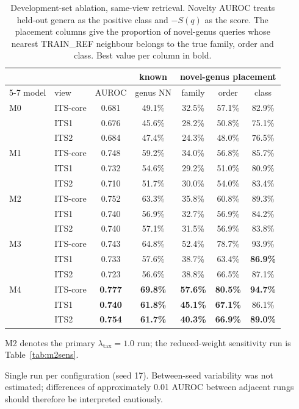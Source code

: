 \begin{table}[htbp]\centering
\begin{threeparttable}
\caption{Development-set ablation, same-view retrieval. Novelty AUROC treats held-out genera as the positive class and $-S(q)$ as the score. The placement columns give the proportion of novel-genus queries whose nearest TRAIN\_REF neighbour belongs to the true family, order and class. Best value per column in bold.}
\label{tab:ablation}
\small
\begin{tabular}{llccccc}
\toprule
 & & & known & \multicolumn{3}{c}{novel-genus placement} \\
\cmidrule(l){5-7}
model & view & AUROC & genus NN & family & order & class \\
\midrule
M0 & ITS-core & 0.681 & 49.1\% & 32.5\% & 57.1\% & 82.9\% \\
 & ITS1 & 0.676 & 45.6\% & 28.2\% & 50.8\% & 75.1\% \\
 & ITS2 & 0.684 & 47.4\% & 24.3\% & 48.0\% & 76.5\% \\
\addlinespace
M1 & ITS-core & 0.748 & 59.2\% & 34.0\% & 56.8\% & 85.7\% \\
 & ITS1 & 0.732 & 54.6\% & 29.2\% & 51.0\% & 80.9\% \\
 & ITS2 & 0.710 & 51.7\% & 30.0\% & 54.0\% & 83.4\% \\
\addlinespace
M2 & ITS-core & 0.752 & 63.3\% & 35.8\% & 60.8\% & 89.3\% \\
 & ITS1 & 0.740 & 56.9\% & 32.7\% & 56.9\% & 84.2\% \\
 & ITS2 & 0.740 & 57.1\% & 31.5\% & 56.9\% & 83.8\% \\
\addlinespace
M3 & ITS-core & 0.743 & 64.8\% & 52.4\% & 78.7\% & 93.9\% \\
 & ITS1 & 0.733 & 57.6\% & 38.7\% & 63.4\% & \textbf{86.9\%} \\
 & ITS2 & 0.723 & 56.6\% & 38.8\% & 66.5\% & 87.1\% \\
\addlinespace
M4 & ITS-core & \textbf{0.777} & \textbf{69.8\%} & \textbf{57.6\%} & \textbf{80.5\%} & \textbf{94.7\%} \\
 & ITS1 & \textbf{0.740} & \textbf{61.8\%} & \textbf{45.1\%} & \textbf{67.1\%} & 86.1\% \\
 & ITS2 & \textbf{0.754} & \textbf{61.7\%} & \textbf{40.3\%} & \textbf{66.9\%} & \textbf{89.0\%} \\
\bottomrule
\end{tabular}
\begin{tablenotes}\footnotesize
\item M2 denotes the primary $\lambda_{\mathrm{tax}}=1.0$ run; the reduced-weight sensitivity run is Table~\ref{tab:m2sens}.
\item Single run per configuration (seed 17). Between-seed variability was not estimated; differences of approximately 0.01 AUROC between adjacent rungs should therefore be interpreted cautiously.
\end{tablenotes}
\end{threeparttable}
\end{table}
